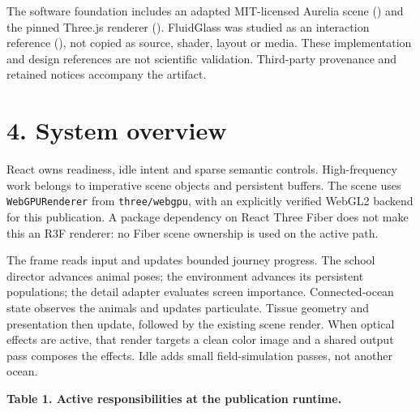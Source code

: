 \documentclass[
  english,
  11pt,
]{article}
\begin{document}
The software foundation includes an adapted MIT-licensed Aurelia scene
() and the pinned Three.js renderer
(). FluidGlass was
studied as an interaction reference
(), not copied as source,
shader, layout or media. These implementation and design references are
not scientific validation. Third-party provenance and retained notices
accompany the artifact.

\section{4. System overview}\label{system-overview}

React owns readiness, idle intent and sparse semantic controls.
High-frequency work belongs to imperative scene objects and persistent
buffers. The scene uses \texttt{WebGPURenderer} from
\texttt{three/webgpu}, with an explicitly verified WebGL2 backend for
this publication. A package dependency on React Three Fiber does not
make this an R3F renderer: no Fiber scene ownership is used on the
active path.

The frame reads input and updates bounded journey progress. The school
director advances animal poses; the environment advances its persistent
populations; the detail adapter evaluates screen importance.
Connected-ocean state observes the animals and updates particulate.
Tissue geometry and presentation then update, followed by the existing
scene render. When optical effects are active, that render targets a
clean color image and a shared output pass composes the effects. Idle
adds small field-simulation passes, not another ocean.

\textbf{Table 1. Active responsibilities at the publication runtime.}
\end{document}
